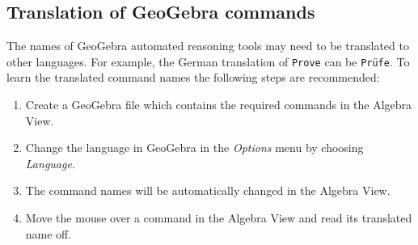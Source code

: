 \documentclass{article}
\begin{document}
\subsection{Translation of GeoGebra commands}

The names of GeoGebra automated reasoning tools may need to be translated to other languages. For example, the German translation of \texttt{Prove} can be \texttt{Pr\"ufe}.
To learn the translated command names the following steps are recommended:

\begin{enumerate}
\item Create a GeoGebra file which contains the required commands in the Algebra View.
\item Change the language in GeoGebra in the \textit{Options} menu by choosing \textit{Language}.
\item The command names will be automatically changed in the Algebra View.
\item Move the mouse over a command in the Algebra View and read its translated name off.
\end{enumerate}


\end{document}
